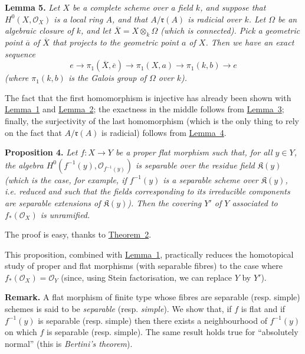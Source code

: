 \documentclass{article}
\newenvironment{itenv}[1]
  {\phantomsection\par\medskip\noindent\textbf{#1.}\itshape}
  {\medskip}
\newenvironment{rmenv}[1]
  {\phantomsection\par\medskip\noindent\textbf{#1.}\rmfamily}
  {\medskip}
\newcommand{\scr}[1]{{\mathscr{#1}}}
\newcommand{\fk}{\mathfrak}
\newcommand{\kres}{\mathfrak{K}}
\newcommand{\oldpage}[1]{\marginpar{\footnotesize$\Big\vert$ \textit{p.~#1}}}
\begin{document}
\begin{itenv}{Lemma 5}
\label{lemma5}
  Let $X$ be a complete scheme over a field $k$, and suppose that $H^0(X,\scr{O}_X)$ is a local ring $A$, and that $A/\fk{r}(A)$ is radicial over $k$.
  Let $\Omega$ be an algebraic closure of $k$, and let $\overline{X}=X\otimes_k\Omega$ (which is connected).
  Pick a geometric point $\overline{a}$ of $\overline{X}$ that projects to the geometric point $a$ of $X$.
  Then we have an exact sequence
  \[
    e
    \to \pi_1(\overline{X},\overline{e})
    \to \pi_1(X,a)
    \to \pi_1(k,b)
    \to e
  \]
  (where $\pi_1(k,b)$ is the Galois group of $\Omega$ over $k$).
\end{itenv}

The fact that the first homomorphism is injective has already been shown with \hyperref[lemma1]{Lemma~1} and \hyperref[lemma2]{Lemma~2};
the exactness in the middle follows from \hyperref[lemma3]{Lemma~3};
finally, the surjectivity of the last homomorphism (which is the only thing to rely on the fact that $A/\fk{r}(A)$ is radicial) follows from \hyperref[lemma4]{Lemma~4}.

\begin{itenv}{Proposition 4}
\label{proposition4}
  Let $f\colon X\to Y$ be a proper flat morphism such that, for all $y\in Y$, the algebra $H^0(f^{-1}(y),\scr{O}_{f^{-1}(y)})$ is separable over the residue field $\kres(y)$ (which is the case, for example, if $f^{-1}(y)$ is a \emph{separable scheme} over $\kres(y)$, i.e. reduced and such that the fields corresponding to its irreducible components are separable extensions of $\kres(y)$).
  Then the covering
\oldpage{182-21}
  $Y'$ of $Y$ associated to $f_*(\scr{O}_X)$ is unramified.
\end{itenv}

The proof is easy, thanks to \hyperref[theorem2]{Theorem~2}.

This proposition, combined with \hyperref[lemma1]{Lemma~1}, practically reduces the homotopical study of proper and flat morphisms (with separable fibres) to the case where $f_*(\scr{O}_X)=\scr{O}_Y$ (since, using Stein factorisation, we can replace $Y$ by $Y'$).

\begin{rmenv}{Remark}
  A flat morphism of finite type whose fibres are separable (resp. simple) schemes is said to be \emph{separable} (resp. \emph{simple}).
  We show that, if $f$ is flat and if $f^{-1}(y)$ is separable (resp. simple) then there exists a neighbourhood of $f^{-1}(y)$ on which $f$ is separable (resp. simple).
  The same result holds true for ``absolutely normal'' (this is \emph{Bertini's theorem}).
\end{rmenv}
\end{document}
